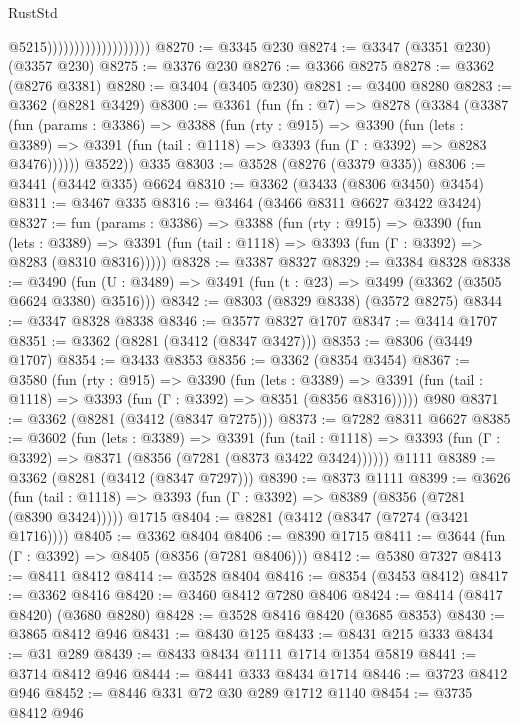 \begin{lexlean}{RustStd}
\begin{coremodule}
                                          @5215)))))))))))))))))))
@8270 := @3345 @230
@8274 := @3347 (@3351 @230) (@3357 @230)
@8275 := @3376 @230
@8276 := @3366 @8275
@8278 := @3362 (@8276 @3381)
@8280 := @3404 (@3405 @230)
@8281 := @3400 @8280
@8283 := @3362 (@8281 @3429)
@8300 := @3361
    (fun (fn : @7) =>
    @8278
      (@3384
        (@3387
          (fun (params : @3386) =>
          @3388
            (fun (rty : @915) =>
            @3390
              (fun (lets : @3389) =>
              @3391 (fun (tail : @1118) => @3393 (fun (Γ : @3392) => @8283 @3476))))))
        @3522))
    @335
@8303 := @3528 (@8276 (@3379 @335))
@8306 := @3441 (@3442 @335) @6624
@8310 := @3362 (@3433 (@8306 @3450) @3454)
@8311 := @3467 @335
@8316 := @3464 (@3466 @8311 @6627 @3422 @3424)
@8327 := fun (params : @3386) =>
  @3388
    (fun (rty : @915) =>
    @3390
      (fun (lets : @3389) =>
      @3391 (fun (tail : @1118) => @3393 (fun (Γ : @3392) => @8283 (@8310 @8316)))))
@8328 := @3387 @8327
@8329 := @3384 @8328
@8338 := @3490 (fun (U : @3489) => @3491 (fun (t : @23) => @3499 (@3362 (@3505 @6624 @3380) @3516)))
@8342 := @8303 (@8329 @8338) (@3572 @8275)
@8344 := @3347 @8328 @8338
@8346 := @3577 @8327 @1707
@8347 := @3414 @1707
@8351 := @3362 (@8281 (@3412 (@8347 @3427)))
@8353 := @8306 (@3449 @1707)
@8354 := @3433 @8353
@8356 := @3362 (@8354 @3454)
@8367 := @3580
    (fun (rty : @915) =>
    @3390
      (fun (lets : @3389) =>
      @3391 (fun (tail : @1118) => @3393 (fun (Γ : @3392) => @8351 (@8356 @8316)))))
    @980
@8371 := @3362 (@8281 (@3412 (@8347 @7275)))
@8373 := @7282 @8311 @6627
@8385 := @3602
    (fun (lets : @3389) =>
    @3391
      (fun (tail : @1118) => @3393 (fun (Γ : @3392) => @8371 (@8356 (@7281 (@8373 @3422 @3424))))))
    @1111
@8389 := @3362 (@8281 (@3412 (@8347 @7297)))
@8390 := @8373 @1111
@8399 := @3626
    (fun (tail : @1118) => @3393 (fun (Γ : @3392) => @8389 (@8356 (@7281 (@8390 @3424)))))
    @1715
@8404 := @8281 (@3412 (@8347 (@7274 (@3421 @1716))))
@8405 := @3362 @8404
@8406 := @8390 @1715
@8411 := @3644 (fun (Γ : @3392) => @8405 (@8356 (@7281 @8406)))
@8412 := @5380 @7327
@8413 := @8411 @8412
@8414 := @3528 @8404
@8416 := @8354 (@3453 @8412)
@8417 := @3362 @8416
@8420 := @3460 @8412 @7280 @8406
@8424 := @8414 (@8417 @8420) (@3680 @8280)
@8428 := @3528 @8416 @8420 (@3685 @8353)
@8430 := @3865 @8412 @946
@8431 := @8430 @125
@8433 := @8431 @215 @333
@8434 := @31 @289
@8439 := @8433 @8434 @1111 @1714 @1354 @5819
@8441 := @3714 @8412 @946
@8444 := @8441 @333 @8434 @1714
@8446 := @3723 @8412 @946
@8452 := @8446 @331 @72 @30 @289 @1712 @1140
@8454 := @3735 @8412 @946

\end{coremodule}
\end{lexlean}
